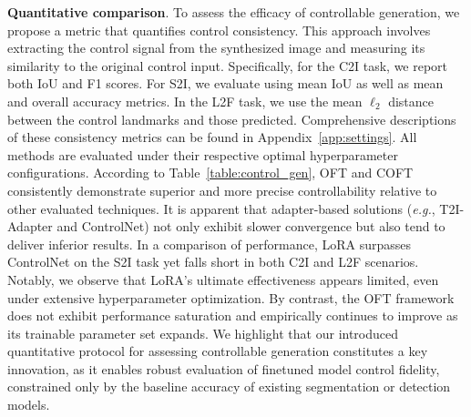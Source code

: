 {\textbf{Quantitative comparison}. To assess the efficacy of controllable generation, we propose a metric that quantifies control consistency. This approach involves extracting the control signal from the synthesized image and measuring its similarity to the original control input. Specifically, for the C2I task, we report both IoU and F1 scores. For S2I, we evaluate using mean IoU as well as mean and overall accuracy metrics. In the L2F task, we use the mean $\ell_2$ distance between the control landmarks and those predicted. Comprehensive descriptions of these consistency metrics can be found in Appendix~\ref{app:settings}. All methods are evaluated under their respective optimal hyperparameter configurations. According to Table~\ref{table:control_gen}, OFT and COFT consistently demonstrate superior and more precise controllability relative to other evaluated techniques. It is apparent that adapter-based solutions (\emph{e.g.}, T2I-Adapter and ControlNet) not only exhibit slower convergence but also tend to deliver inferior results. In a comparison of performance, LoRA surpasses ControlNet on the S2I task yet falls short in both C2I and L2F scenarios. Notably, we observe that LoRA’s ultimate effectiveness appears limited, even under extensive hyperparameter optimization. By contrast, the OFT framework does not exhibit performance saturation and empirically continues to improve as its trainable parameter set expands. We highlight that our introduced quantitative protocol for assessing controllable generation constitutes a key innovation, as it enables robust evaluation of finetuned model control fidelity, constrained only by the baseline accuracy of existing segmentation or detection models.

}
